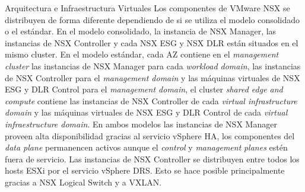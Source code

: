 \begin{subsection}{Arquitectura e Infraestructura Virtuales\cite{CFVirtInfraes}}
Los componentes de VMware NSX se distribuyen de forma diferente dependiendo de si se utiliza el modelo consolidado o el estándar. En el modelo consolidado, la instancia de NSX Manager, las instancias de NSX Controller y cada NSX ESG y NSX DLR están situados en el mismo cluster. En el modelo estándar, cada AZ contiene en el \textit{management cluster} las instancias de NSX Manager para cada \textit{workload domain}, las instancias de NSX Controller para el \textit{management domain} y las máquinas virtuales de NSX ESG y DLR Control para el \textit{management domain}, el cluster \textit{shared edge and compute} contiene las instancias de NSX Controller de cada \textit{virtual infrastructure domain} y las máquinas virtuales de NSX ESG y DLR Control de cada \textit{virtual infraestructure domain}. En ambos modelos las instancias de NSX Manager proveen alta disponibilidad gracias al servicio vSphere HA, los componentes del \textit{data plane} permanencen activos aunque el \textit{control} y \textit{management} \textit{planes} estén fuera de servicio. Las instancias de NSX Controller se distribuyen entre todos los hosts ESXi por el servicio vSphere DRS.
 Esto se hace posible principalmente gracias a NSX Logical Switch y a VXLAN.\\





\end{subsection}
